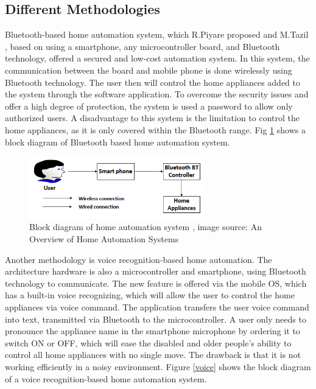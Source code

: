 \documentclass[conference]{IEEEtran}
\begin{document}
 \subsection{Different Methodologies }
 
Bluetooth-based home automation system, which R.Piyare proposed and M.Tazil \cite{Tazil}, based on using a  smartphone, any microcontroller board, and Bluetooth technology, offered a  secured and low-cost automation system. In this system, the communication between the board and mobile phone is done wirelessly using Bluetooth technology. The user then will control the home appliances added to the system through the software application. To overcome the security issues and offer a high degree of protection, the system is used a password to allow only authorized users. A disadvantage to this system is the limitation to control the home appliances, as it is only covered within the Bluetooth range. Fig \ref{Blutooth} shows a block diagram of Bluetooth based home automation system. 

\begin{figure}[h!]
	\centering
	\includegraphics[width=3in]{Blutooth.png}
	\caption{\label{Blutooth}  Block diagram of home automation system 
		, image source: An Overview of Home Automation Systems
		\cite{blutooth} }
\end{figure}



Another methodology is voice recognition-based home automation. The architecture hardware is also a microcontroller and smartphone, using Bluetooth technology to communicate. The new feature is offered via the mobile OS, which has a  built-in voice recognizing, which will allow the user to control the home appliances via voice command. The application transfers the user voice command into text, transmitted via Bluetooth to the microcontroller. A user only needs to pronounce the appliance name in the smartphone microphone by ordering it to switch ON or OFF, which will ease the disabled and older people's ability to control all home appliances with no single move. The drawback is that it is not working efficiently in a noisy environment. Figure \ref {voice} shows the block diagram of a voice recognition-based home automation system. 
\end{document}
